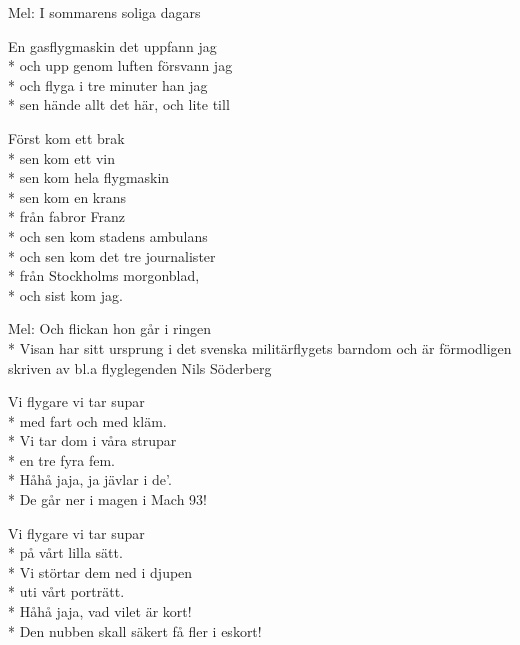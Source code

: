 \pagestyle{Flygarsånger}
\begin{SongText}[Gasflygmaskinen]
    \begin{SongInfo}
        Mel: I sommarens soliga dagars
    \end{SongInfo}
    \begin{SongVerse}
        En gasflygmaskin det uppfann jag\\*%
        och upp genom luften försvann jag\\*%
        och flyga i tre minuter han jag\\*%
        sen hände allt det här, och lite till
    \end{SongVerse}
    \begin{SongVerse}
        Först kom ett brak\\*%
        sen kom ett vin\\*%
        sen kom hela flygmaskin\\*%
        sen kom en krans\\*%
        från fabror Franz\\*%
        och sen kom stadens ambulans\\*%
        och sen kom det tre journalister\\*%
        från Stockholms morgonblad,\\*%
        och sist kom jag.
    \end{SongVerse}
\end{SongText}
\begin{SongText}[Flygarsupen]
    \begin{SongInfo}
        Mel: Och flickan hon går i ringen\\*%
        Visan har sitt ursprung i det svenska militärflygets barndom och är förmodligen skriven av bl.a flyglegenden Nils Söderberg
    \end{SongInfo}
    \begin{SongVerse}
        Vi flygare vi tar supar\\*%
        med fart och med kläm.\\*%
        Vi tar dom i våra strupar\\*%
        en tre fyra fem.\\*%
        Håhå jaja, ja jävlar i de'.\\*%
        De går ner i magen i Mach 93!
    \end{SongVerse}
    \begin{SongVerse}
        Vi flygare vi tar supar\\*%
        på vårt lilla sätt.\\*%
        Vi störtar dem ned i djupen\\*%
        uti vårt porträtt.\\*%
        Håhå jaja, vad vilet är kort!\\*%
        Den nubben skall säkert få fler i eskort!
    \end{SongVerse}
\end{SongText}

